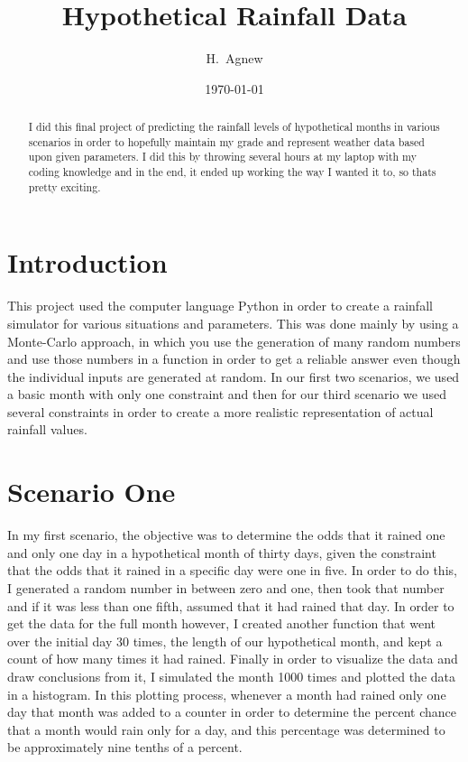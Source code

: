 \documentclass[twocolumn]{revtex4}
\begin{document}
\title{
Hypothetical Rainfall Data
}

\author{H.~Agnew}
\date{\today}

\begin{abstract}
I did this final project of predicting the rainfall levels of hypothetical months in various scenarios in order to hopefully maintain my grade and represent weather data based upon given parameters. I did this by throwing several hours at my laptop with my coding knowledge and in the end, it ended up working the way I wanted it to, so thats pretty exciting.
  
\end{abstract}

\maketitle
\section{Introduction}
This project used the computer language Python in order to create a rainfall simulator for various situations and parameters. This was done mainly by using a Monte-Carlo approach, in which you use the generation of many random numbers and use those numbers in a function in order to get a reliable answer even though the individual inputs are generated at random. In our first two scenarios, we used a basic month with only one constraint and then for our third scenario we used several constraints in order to create a more realistic representation of actual rainfall values.
\section{Scenario One}
In my first scenario, the objective was to determine the odds that it rained one and only one day in a hypothetical month of thirty days, given the constraint that the odds that it rained in a specific day were one in five. In order to do this, I generated a random number in between zero and one, then took that number and if it was less than one fifth, assumed that it had rained that day. In order to get the data for the full month however, I created another function that went over the initial day 30 times, the length of our hypothetical month, and kept a count of how many times it had rained. Finally in order to visualize the data and draw conclusions from it, I simulated the month 1000 times and plotted the data in a histogram. In this plotting process, whenever a month had rained only one day that month was added to a counter in order to determine the percent chance that a month would rain only for a day, and this percentage was determined to be approximately nine tenths of a percent.
\end{document}
